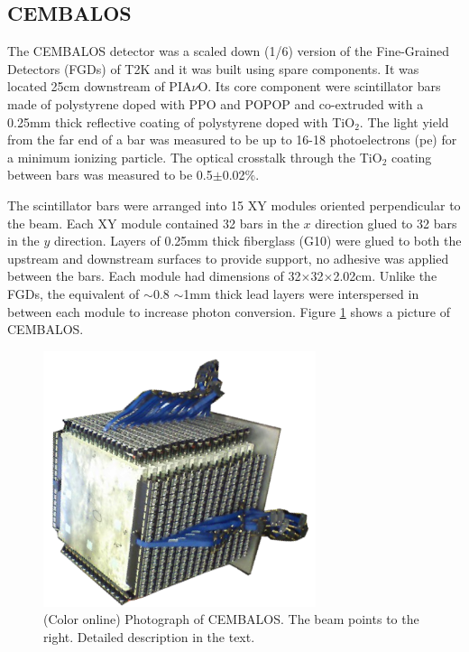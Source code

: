 \subsection{CEMBALOS}
The CEMBALOS detector was a scaled down (1/6) version of the Fine-Grained Detectors (FGDs) of T2K \cite{fgd} and it was built using spare components. It was located 25cm downstream of PIA$\nu$O. Its core component were scintillator bars made of polystyrene doped with PPO and POPOP and co-extruded with a 0.25mm thick reflective coating of polystyrene doped with TiO$_2$. The light yield from the far end of a bar was measured to be up to 16-18 photoelectrons (pe) for a minimum ionizing particle. The optical crosstalk through the TiO$_2$ coating between bars was measured to be 0.5$\pm$0.02\%. 

The scintillator bars were arranged into 15 XY modules oriented perpendicular to the beam. Each XY module contained 32 bars in the $x$ direction glued to 32 bars in the $y$ direction. Layers of 0.25mm thick fiberglass (G10) were glued to both the upstream and downstream surfaces to provide support, no adhesive was applied between the bars. Each module had dimensions of 32$\times$32$\times$2.02cm. Unlike the FGDs, the equivalent of $\sim0.8$  $\sim$1mm thick lead layers were interspersed in between each module to increase photon conversion. Figure \ref{fig:cembalos} shows a picture of CEMBALOS.

\begin{figure}[!h]
\begin{center}
\includegraphics[width=80mm]{figures/cembalos_photo.png}
\caption{(Color online) Photograph of CEMBALOS. The beam points to the right. Detailed description in the text.\label{fig:cembalos}}
\end{center} 
\end{figure}


